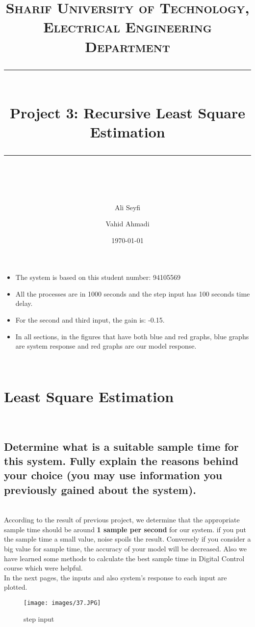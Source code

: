 \documentclass[11pt]{scrartcl} %
\title{	
	\normalfont\normalsize
	\textsc{Sharif University of Technology, Electrical Engineering Department}\\ %
	\vspace{25pt} %
	\rule{\linewidth}{0.5pt}\\ %
	\vspace{20pt} %
	{\huge Project 3: Recursive Least Square Estimation}\\ %
	\vspace{12pt} %
	\rule{\linewidth}{2pt}\\ %
	\vspace{12pt} %
}
\author{\LARGE Ali Seyfi \and \LARGE Vahid Ahmadi}
\date{\normalsize\today}
\begin{document}
\maketitle

\begin{itemize}

\item The system is based on this student number: 94105569\\
\item All the processes are in 1000 seconds and the step input has 100 seconds time delay.\\
\item For the second and third input, the gain is: -0.15.\\
\item In all sections, in the figures that have both blue and red graphs, blue graphs are system response and red graphs are our model response.\\

\end{itemize}\\

\section{Least Square Estimation}\\
\subsection{Determine what is a suitable sample time for this system. Fully explain the reasons behind your choice
(you may use information you previously gained about the system).}
\renewcommand\labelitemi{$\square$}\\


According to the result of previous project, we determine that the appropriate sample time should be around \textbf{1 sample per second} for our system. if you put the sample time a small value, noise spoils the result. Conversely if you consider a big value for sample time, the accuracy of your model will be decreased. Also we have learned some methods to calculate the best sample time in Digital Control course which were helpful.\\

In the next pages, the inputs and also system's response to each input are plotted.
\begin{figure}[H]
	\centering
	\texttt{[image: images/37.JPG]}
	\caption{step input}
\end{figure}
\end{document}
